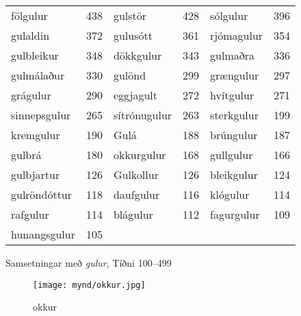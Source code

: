\documentclass[../samsetningasafn.tex]{subfiles}
\begin{document}
\begin{wordlist}[H]
\begin{tcolorbox}

	\setlength{\extrarowheight}{4pt}
	\begin{tabular}{BlBlBl}
		fölgulur		& 438 		& 	
		gulstör		& 428		& 	
		sólgulur		& 396		\\ 
		gulaldin		& 372		& 
		gulusótt		& 361		& 
		rjómagulur	& 354		\\ 	
		gulbleikur	& 348		& 
		dökkgulur	& 343		& 
		gulmaðra	& 336		\\ 
		gulmálaður	& 330		& 
		gulönd		& 299		& 	
		grængulur	& 297		\\ 
		grágulur		& 290		& 
		eggjagult	& 272		& 
		hvítgulur		& 271		\\ 	
		sinnepsgulur	& 265		& 
		sítrónugulur	& 263		& 
		sterkgulur	& 199		\\ 
		kremgulur	& 190		& 
		Gulá		& 188		& 	
		brúngulur	& 187		\\ 	
		gulbrá		& 180		& 	
		okkurgulur	& 168		& 
		gullgulur		& 166		\\ 	
		gulbjartur	& 126		& 
		Gulkollur	& 126		& 
		bleikgulur	& 124		\\ 
		gulröndóttur	& 118		& 
		daufgulur	& 116		& 
		klógulur		& 114		\\ 	
		rafgulur		& 114		& 
		blágulur		& 112		& 
		fagurgulur	& 109		\\ 
		hunangsgulur & 105		& 	
					&			&
					&
	\end{tabular}

\end{tcolorbox}
	\caption{Samsetningar með \textit{gulur}, Tíðni 100--499}
	\label{listi:gult.100}
\end{wordlist}

\begin{figure}[H]
\begin{tcolorbox}
\centering
	\texttt{[image: mynd/okkur.jpg]}
\end{tcolorbox}
	\caption{okkur}
	\label{mynd:okkur}
\end{figure}
\end{document}
